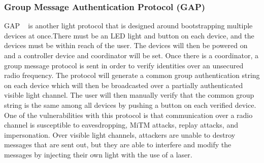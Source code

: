 \subsubsection{Group Message Authentication Protocol (GAP)}
GAP ~\cite{perkovic2012secure} is another light protocol that is designed around bootstrapping multiple devices at once.There must be an LED light and button on each device, and the devices must be within reach of the user. The devices will then be powered on and a controller device and coordinator will be set. Once there is a coordinator, a group message protocol is sent in order to verify identities over an unsecured radio frequency. The protocol will generate a common group authentication string on each device which will then be broadcasted over a partially authenticated visible light channel. The user will then manually verify that the common group string is the same among all devices by pushing a button on each verified device. One of the vulnerabilities with this protocol is that communication over a radio channel is susceptible to eavesdropping, MiTM attacks, replay attacks, and impersonation. Over visible light channels, attackers are unable to destroy messages that are sent out, but they are able to interfere and modify the messages by injecting their own light with the use of a laser. 


